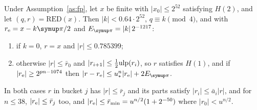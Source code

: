 \begin{lemma}\label{lem:red}
Under Assumption~\ref{as:fp}, let $x$ be finite with $|x_0| \le 2^{52}$ satisfying $H(2)$, and let $(q, r) = \mathrm{RED}(x)$.
Then $|k| < 0.64\cdot2^{52}$, $q \equiv k \pmod 4$, and with $r_{\rm e} = x - k\cpi/2$ and $E_{\cpi} = |k|\,2^{-1217}$:
\begin{enumerate}
\item[(a)] if $k = 0$, $r = x$ and $|r| \le 0.785399$;
\item[(b)] otherwise $|r| \le \bar r_0$ and $|r_{i+1}| \le \frac12\mathrm{ulp}(r_i)$, so $r$ satisfies $H(1)$, and if
  $|r_{\rm e}| \ge 2^{pn-1074}$ then $|r - r_{\rm e}| \le u_*^n|r_{\rm e}| + 2E_{\cpi}$.
\end{enumerate}
In both cases $r$ in bucket $j$ has $|r| \le \bar r_j$ and its parts satisfy $|r_i| \le \bar a_i|r|$, and for $n \le
38$, $|r_{\rm e}| \le \bar r_j$ too, and $|r_{\rm e}| \le \bar r_{\min} = u^{n/2}(1 + 2^{-50})$ where $|r_0| <
u^{n/2}$.
\end{lemma}

